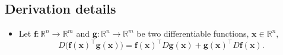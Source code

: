\documentclass[12pt,thmsa]{article}
\begin{document}
\subsection{Derivation details}

\begin{itemize}
	\item Let \(\boldsymbol{f}: \mathbb{R}^{n} \rightarrow \mathbb{R}^{m}\) and \(\boldsymbol{g}: \mathbb{R}^{n} \rightarrow \mathbb{R}^{m}\) be two differentiable functions, \(\boldsymbol{x} \in \mathbb{R}^{n}\),
	\[ D \bigg (\boldsymbol{f}(\boldsymbol{x})^{\top} \boldsymbol{g}(\boldsymbol{x}) \bigg )
	=\boldsymbol{f}(\boldsymbol{x})^{\top} D \boldsymbol{g}(\boldsymbol{x})+\boldsymbol{g}(\boldsymbol{x})^{\top} D \boldsymbol{f}(\boldsymbol{x}). \]


\end{itemize}
\end{document}
